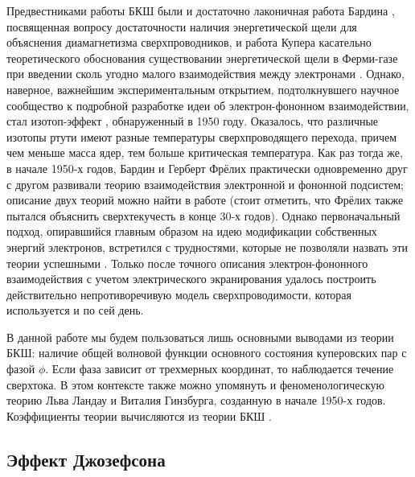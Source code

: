 \documentclass[14pt, a4paper]{extreport}
\numberwithin{equation}{section}
\begin{document}
Предвестниками работы БКШ были и достаточно лаконичная работа Бардина \cite{bardeen1955theory}, посвященная вопросу достаточности наличия энергетической щели для объяснения диамагнетизма сверхпроводников, и работа Купера касательно теоретического обоснования существовании энергетической щели в Ферми-газе при введении сколь угодно малого взаимодействия между электронами \cite{cooper1956bound}. Однако, наверное, важнейшим экспериментальным открытием, подтолкнувшего научное сообщество к подробной разработке идеи об электрон-фононном взаимодействии, стал изотоп-эффект \cite{maxwell1950isotope,reynolds1950superconductivity,de1954isotope}, обнаруженный в 1950 году. Оказалось, что различные изотопы ртути имеют разные температуры сверхпроводящего перехода, причем чем меньше масса ядер, тем больше критическая температура. Как раз тогда же, в начале 1950-х годов, Бардин и Герберт Фрёлих практически одновременно друг с другом развивали теорию взаимодействия электронной и фононной подсистем; описание двух теорий можно найти в работе \cite{bardeen1951electron} (стоит отметить, что Фрёлих также пытался объяснить сверхтекучесть в конце 30-х годов). Однако первоначальный подход, опиравшийся главным образом на идею модификации собственных энергий электронов, встретился с трудностями, которые не позволяли назвать эти теории успешными \cite{bardeen1957theory}. Только после точного описания электрон-фононного взаимодействия с учетом электрического экранирования \cite{bardeen1955electron} удалось построить действительно непротиворечивую модель сверхпроводимости, которая используется и по сей день.

В данной работе мы будем пользоваться лишь основными выводами из теории БКШ: наличие общей волновой функции основного состояния куперовских пар с фазой $\phi$. Если фаза зависит от трехмерных координат, то наблюдается течение сверхтока. В этом контексте также можно упомянуть и феноменологическую теорию Льва Ландау и Виталия Гинзбурга, созданную в начале 1950-х годов. Коэффициенты теории вычисляются из теории БКШ \cite{gor1959microscopic}.

\subsection{Эффект Джозефсона}
\end{document}
